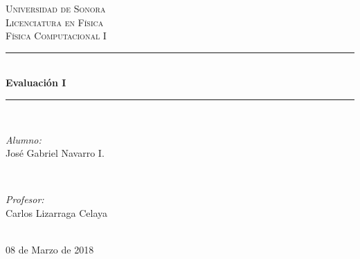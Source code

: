 \documentclass[12pt]{article}
\begin{document}
\begin{titlepage}

\newcommand{\HRule}{\rule{\linewidth}{0.5mm}} %

\center 

\textsc{\LARGE Universidad de Sonora}\\[1.5cm]
\textsc{\Large Licenciatura en Física}\\[0.5cm]
\textsc{\large Física Computacional I}\\[0.5cm]


\HRule \\[0.4cm]
{\huge \bfseries Evaluación I}\\[0.4cm] %
\HRule \\[1.5cm]
 

\begin{minipage}{0.4\textwidth}
\begin{flushleft} \large
\emph{Alumno:}\\
José Gabriel Navarro I.
\end{flushleft}
\end{minipage}
~
\begin{minipage}{0.4\textwidth}
\begin{flushright} \large
\emph{Profesor:} \\
Carlos Lizarraga Celaya
\end{flushright}
\end{minipage}\\[2cm]


08 de Marzo de 2018



\end{titlepage}
\end{document}
